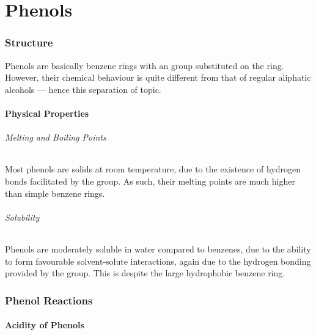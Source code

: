 

\pagebreak
\hypertarget{ChapterPhenols}{}
\part{Phenols}

	\section{Structure}

		Phenols are basically benzene rings with an  group substituted on the ring. However, their chemical behaviour is quite
		different from that of regular aliphatic alcohols --- hence this separation of topic.



		\subsection{Physical Properties}

			\paragraph{Melting and Boiling Points}

			Most phenols are solids at room temperature, due to the existence of hydrogen bonds facilitated by the  group. As such,
			their melting points are much higher than simple benzene rings.


			\paragraph{Solubility}

			Phenols are moderately soluble in water compared to benzenes, due to the ability to form favourable solvent-solute interactions,
			again due to the hydrogen bonding provided by the  group. This is despite the large hydrophobic benzene ring.



	\section{Phenol Reactions}

		\subsection{Acidity of Phenols}

